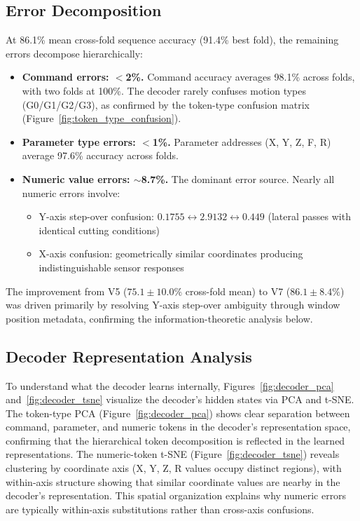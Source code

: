 \documentclass[sensors,article,submit,moreauthors,pdftex]{Definitions/mdpi}
\begin{document}
\subsection{Error Decomposition}

At 86.1\% mean cross-fold sequence accuracy (91.4\% best fold), the remaining errors decompose hierarchically:

\begin{itemize}[leftmargin=*]
    \item \textbf{Command errors: $<$2\%.} Command accuracy averages 98.1\% across folds, with two folds at 100\%. The decoder rarely confuses motion types (G0/G1/G2/G3), as confirmed by the token-type confusion matrix (Figure~\ref{fig:token_type_confusion}).
    \item \textbf{Parameter type errors: $<$1\%.} Parameter addresses (X, Y, Z, F, R) average 97.6\% accuracy across folds.
    \item \textbf{Numeric value errors: $\sim$8.7\%.} The dominant error source. Nearly all numeric errors involve:
    \begin{itemize}[]
        \item Y-axis step-over confusion: $0.1755 \leftrightarrow 2.9132 \leftrightarrow 0.449$ (lateral passes with identical cutting conditions)
        \item X-axis confusion: geometrically similar coordinates producing indistinguishable sensor responses
    \end{itemize}
\end{itemize}

The improvement from V5 ($75.1 \pm 10.0\%$ cross-fold mean) to V7 ($86.1 \pm 8.4\%$) was driven primarily by resolving Y-axis step-over ambiguity through window position metadata, confirming the information-theoretic analysis below.

\subsection{Decoder Representation Analysis}

To understand what the decoder learns internally, Figures~\ref{fig:decoder_pca} and~\ref{fig:decoder_tsne} visualize the decoder's hidden states via PCA and t-SNE. The token-type PCA (Figure~\ref{fig:decoder_pca}) shows clear separation between command, parameter, and numeric tokens in the decoder's representation space, confirming that the hierarchical token decomposition is reflected in the learned representations. The numeric-token t-SNE (Figure~\ref{fig:decoder_tsne}) reveals clustering by coordinate axis (X, Y, Z, R values occupy distinct regions), with within-axis structure showing that similar coordinate values are nearby in the decoder's representation. This spatial organization explains why numeric errors are typically within-axis substitutions rather than cross-axis confusions.
\end{document}
